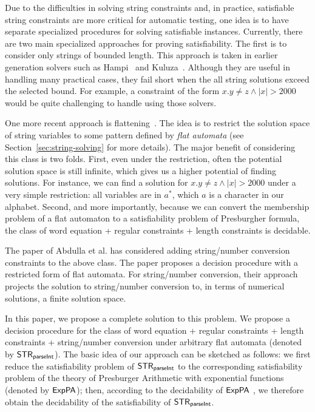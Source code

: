 Due to the difficulties in solving string constraints and, in practice, satisfiable string constraints are more critical for automatic testing, one idea is to have separate specialized procedures for solving satisfiable instances. 
Currently, there are two main specialized approaches for proving satisfiability.
The first is to consider only strings of bounded length.
This approach is taken in earlier generation solvers such as Hampi~\cite{KiezunGAGHE12} and Kuluza~\cite{SaxenaAHMMS10}.
Although they are useful in handling many practical cases, they fail short when the all string solutions exceed the selected bound.
For example, a constraint of the form $x.y \neq z  \wedge |x| > 2000$ would be quite challenging to handle using those solvers.

One more recent approach is flattening~\cite{Parosh:20:PLDI,Parosh:20:PLDI,AbdullaACDHRR18,AbdullaACDHRR17}.
The idea is to restrict the solution space of string variables to some pattern defined by \emph{flat automata} (see Section~\ref{sec:string-solving} for more details). 
The major benefit of considering this class is two folds.
First, even under the restriction, often the potential solution space is still infinite, which gives us a higher potential of finding solutions.
For instance, we can find a solution for $x.y \neq z  \wedge |x| > 2000$ under a very simple restriction: all variables are in $a^*$, which $a$ is a character in our alphabet.
Second, and more importantly, because we can convert the membership problem of a flat automaton to a satisfiability problem of Presburgher formula, the class of word equation + regular constraints + length constraints is decidable.

The paper of Abdulla et al. has considered adding string/number conversion constraints to the above class.
The paper proposes a decision procedure with a restricted form of flat automata.
For string/number conversion, their approach projects the solution to string/number conversion to, in terms of numerical solutions, a finite solution space.

In this paper, we propose a complete solution to this problem.
We propose a decision procedure for the class of word equation + regular constraints + length constraints + string/number conversion under arbitrary flat automata (denoted by ${\sf STR}_{\textsf{parseInt}}$).
The basic idea of our approach can be sketched as follows: we first reduce the satisfiability problem of ${\sf STR}_{\textsf{parseInt}}$ to the corresponding satisfiability problem of the theory of Presburger Arithmetic with exponential functions (denoted by ${\sf ExpPA}$); then, according to the decidability of ${\sf ExpPA}$ \cite{Semenov84}, we therefore obtain the decidability of the satisfiability of ${\sf STR}_{\textsf{parseInt}}$.  

